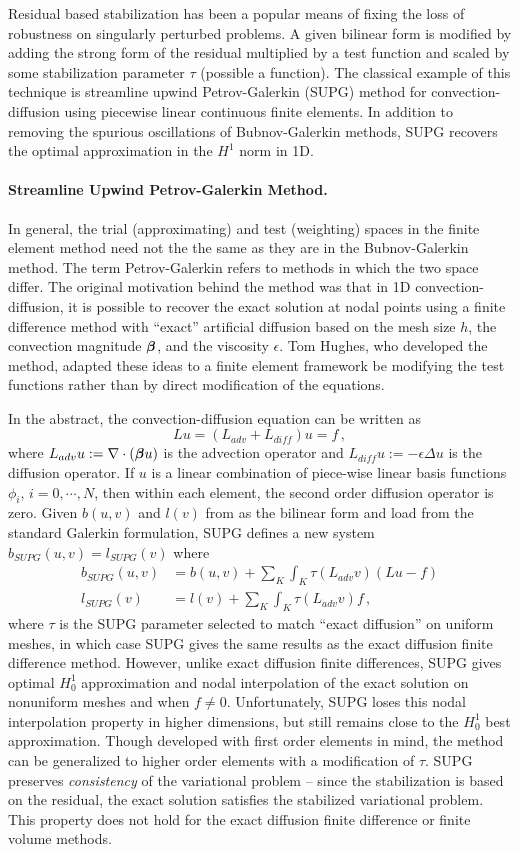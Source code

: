 \documentclass[Dissertation.tex]{subfiles}
\begin{document}
Residual based stabilization has been a popular means of fixing the loss of robustness on singularly perturbed problems.
A given bilinear form is modified by adding the strong form of the residual multiplied by a test function and scaled by some
stabilization parameter $\tau$ (possible a function).
The classical example of this technique is streamline upwind Petrov-Galerkin (SUPG) method for convection-diffusion using piecewise linear
continuous finite elements\cite{SUPG}.
In addition to removing the spurious oscillations of Bubnov-Galerkin methods, SUPG recovers the optimal approximation in the $H^1$ norm in 1D.

\paragraph{Streamline Upwind Petrov-Galerkin Method.}
In general, the trial (approximating) and test (weighting) spaces in the finite element method need not the the same as they are in the Bubnov-Galerkin method.
The term Petrov-Galerkin refers to methods in which the two space differ.
The original motivation behind the method was that in 1D convection-diffusion, it is possible to recover the exact solution at nodal points
using a finite difference method with ``exact'' artificial diffusion based on the mesh size $h$,
the convection magnitude $\boldsymbol\beta$, and the viscosity $\epsilon$.
Tom Hughes, who developed the method, adapted these ideas to a finite element framework be modifying the test functions rather than by direct
modification of the equations.

In the abstract, the convection-diffusion equation can be written as
\[
Lu=(L_{adv}+L_{diff})u=f\,,
\]
where $L_{adv}u:=\nabla\cdot(\boldsymbol\beta u)$ is the advection operator and $L_{diff}u:=-\epsilon\Delta u$ is the diffusion operator.
If $u$ is a linear combination of piece-wise linear basis functions $\phi_i,\,i=0,\cdots,N$, then within each element, the second order diffusion operator is zero.
Given $b(u,v)$ and $l(v)$ from as the bilinear form and load from the standard Galerkin formulation, SUPG defines a new system $b_{SUPG}(u,v)=l_{SUPG}(v)$ where
\begin{align*}
	b_{SUPG}(u,v)&=b(u,v)+\sum_K\int_K\tau(L_{adv}v)(Lu-f)\\
	l_{SUPG}(v)&=l(v)+\sum_K\int_K\tau(L_{adv}v)f\,,
\end{align*}
where $\tau$ is the SUPG parameter selected to match ``exact diffusion'' on uniform meshes, in which case SUPG gives the same results as the
exact diffusion finite difference method.
However, unlike exact diffusion finite differences, SUPG gives optimal $H_0^1$ approximation and nodal interpolation of the exact solution
on nonuniform meshes and when $f\neq0$.
Unfortunately, SUPG loses this nodal interpolation property in higher dimensions, but still remains close to the $H_0^1$ best approximation.
Though developed with first order elements in mind, the method can be generalized to higher order elements with a modification of $\tau$.
SUPG preserves \emph{consistency} of the variational problem -- since the stabilization is based on the residual, the exact solution
satisfies the stabilized variational problem.
This property does not hold for the exact diffusion finite difference or finite volume methods.
\end{document}
